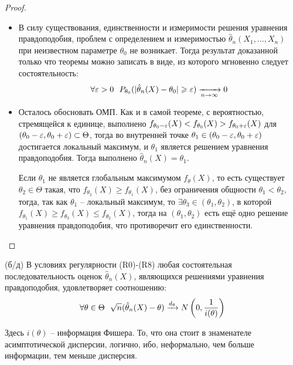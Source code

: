 \begin{proof}~
    \begin{itemize}
        \item В силу существования, единственности и измеримости решения уравнения правдоподобия, проблем с определением и измеримостью $\hat{\theta}_n(X_1, \dots, X_n)$ при неизвестном параметре $\theta_0$ не возникает. Тогда результат доказанной только что теоремы можно записать в виде, из которого мгновенно следует состоятельность:
        \[
            \forall \eps > 0 \ \ P_{\theta_0}(|\hat{\theta}_n(X) - \theta_0| \ge \eps) \xrightarrow[n \to \infty]{} 0
        \]

        \item Осталось обосновать ОМП. Как и в самой теореме, с вероятностью, стремящейся к единице, выполнено $f_{\theta_0-\varepsilon}(X) < f_{\theta_0}(X) > f_{\theta_0+\varepsilon}(X)$ для $(\theta_0 - \varepsilon, \theta_0 + \varepsilon) \subset \Theta$, тогда во внутренней точке $\theta_1 \in (\theta_0 - \varepsilon, \theta_0 + \varepsilon)$ достигается локальный максимум, и $\theta_1$ является решением уравнения правдоподобия. Тогда выполнено $\hat{\theta}_n(X) = \theta_1$.

        Если $\theta_1$ не является глобальным максимумом $f_\theta(X)$, то есть существует $\theta_2 \in \Theta$ такая, что $f_{\theta_2}(X) \ge f_{\theta_1}(X)$, без ограничения общности $\theta_1 < \theta_2$, тогда, так как $\theta_1$ -- локальный максимум, то $\exists \theta_3 \in (\theta_1, \theta_2)$, в которой $f_{\theta_1}(X) \ge f_{\theta_3}(X) \le f_{\theta_2}(X)$, тогда на $(\theta_1, \theta_2)$ есть ещё одно решение уравнения правдоподобия, что противоречит его единственности.
    \end{itemize}
\end{proof}

\begin{theorem} (б/д)
    В условиях регулярности (R0)-(R8) любая состоятельная последовательность оценок $\hat{\theta}_n(X)$, являющихся решениями уравнения правдоподобия, удовлетворяет соотношению:
    \[
        \forall \theta \in \Theta \ \ \sqrt{n}(\hat{\theta}_n(X) - \theta) \xrightarrow{d_\theta} N\ps{0, \frac{1}{i(\theta)}}
    \]
\end{theorem}

\begin{note}
    Здесь $i(\theta)$ -- информация Фишера. То, что она стоит в знаменателе асимптотической дисперсии, логично, ибо, неформально, чем больше информации, тем меньше дисперсия.
\end{note}

